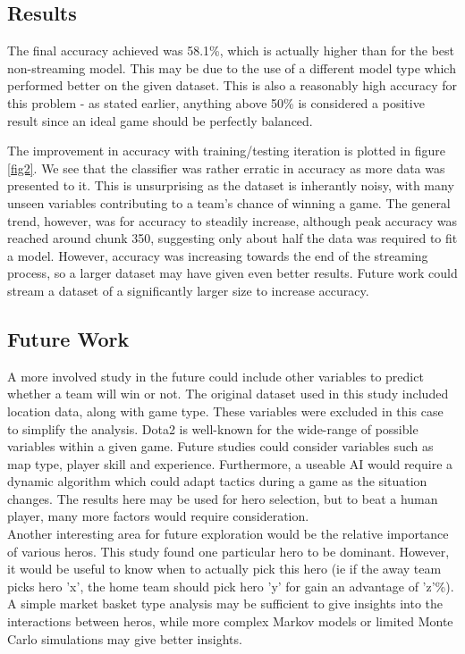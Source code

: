 \documentclass[10pt]{article}
\begin{document}
\subsection{Results}
The final accuracy achieved was 58.1\%, which is actually higher than for the best non-streaming model. This may be due to the use of a different model type which performed better on the given dataset. This is also a reasonably high accuracy for this problem - as stated earlier, anything above 50\% is considered a positive result since an ideal game should be perfectly balanced.

The improvement in accuracy with training/testing iteration is plotted in figure \ref{fig2}. We see that the classifier was rather erratic in accuracy as more data was presented to it. This is unsurprising as the dataset is inherantly noisy, with many unseen variables contributing to a team's chance of winning a game. The general trend, however, was for accuracy to steadily increase, although peak accuracy was reached around chunk 350, suggesting only about half the data was required to fit a model. However, accuracy was increasing towards the end of the streaming process, so a larger dataset may have given even better results. Future work could stream a dataset of a significantly larger size to increase accuracy.\\

\subsection{Future Work}
A more involved study in the future could include other variables to predict whether a team will win or not. The original dataset used in this study included location data, along with game type. These variables were excluded in this case to simplify the analysis. Dota2 is well-known for the wide-range of possible variables within a given game. Future studies could consider variables such as map type, player skill and experience. Furthermore, a useable AI would require a dynamic algorithm which could adapt tactics during a game as the situation changes. The results here may be used for hero selection, but to beat a human player, many more factors would require consideration. \\

Another interesting area for future exploration would be the relative importance of various heros. This study found one particular hero to be dominant. However, it would be useful to know when to actually pick this hero (ie if the away team picks hero 'x', the home team should pick hero 'y' for gain an advantage of 'z'\%). A simple market basket type analysis may be sufficient to give insights into the interactions between heros, while more complex Markov models \cite{6080982} or limited Monte Carlo simulations may give better insights.
\end{document}
